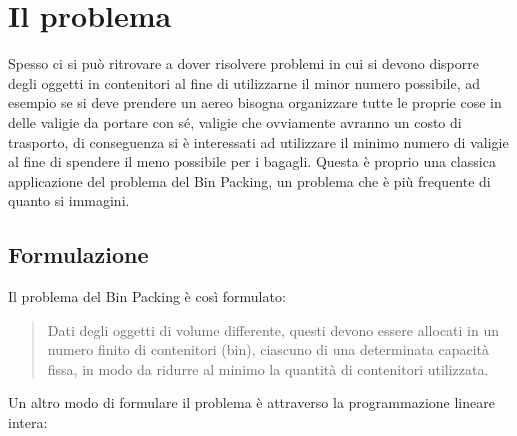 \section{Il problema}
Spesso ci si può ritrovare a dover risolvere problemi in cui si devono disporre degli oggetti in contenitori al fine
di utilizzarne il minor numero possibile, ad esempio se si deve prendere un aereo bisogna organizzare tutte le proprie cose in delle
valigie da portare con sé, valigie che ovviamente avranno un costo di trasporto, di conseguenza si è interessati ad
utilizzare il minimo numero di valigie al fine di spendere il meno possibile per i bagagli. Questa è proprio una
classica applicazione del problema del Bin Packing, un problema che è più frequente di quanto si immagini.

\subsection{Formulazione}
Il problema del Bin Packing è così formulato:
\begin{quote}
	Dati degli oggetti di volume differente, questi devono essere allocati in un numero finito di
	contenitori (bin), ciascuno di una determinata capacità fissa, in modo da ridurre al minimo la
	quantità di contenitori utilizzata.
\end{quote}
\noindent
Un altro modo di formulare il problema è attraverso la programmazione lineare intera:
